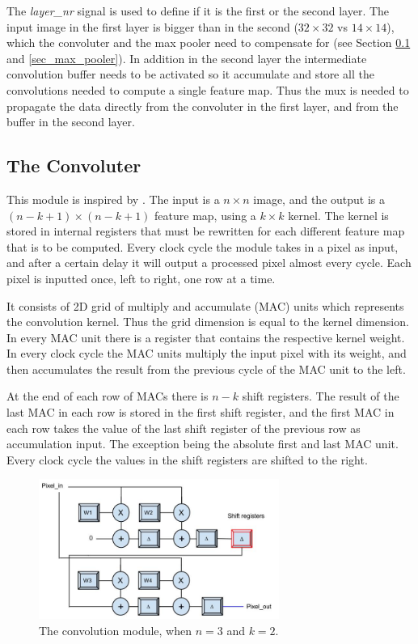 The \textit{layer\_nr} signal is used to define if it is the first or the second layer. The input image in the first layer is bigger than in the second ($ 32 \times 32 $ vs $ 14 \times 14 $), which the convoluter and the max pooler need to compensate for (see Section \ref{sec_convoluter} and \ref{sec_max_pooler}). In addition in the second layer the intermediate convolution buffer needs to be activated so it accumulate and store all the convolutions needed to compute a single feature map. Thus the mux is needed to propagate the data directly from the convoluter in the first layer, and from the buffer in the second layer. 


\subsection{The Convoluter} \label{sec_convoluter}

This module is inspired by \cite{Farabet2009}. The input is a $ n \times n $ image, and the output is a $ (n-k+1) \times (n-k+1) $ feature map, using a $ k \times k $ kernel. The kernel is stored in internal registers that must be rewritten for each different feature map that is to be computed. Every clock cycle the module takes in a pixel as input, and after a certain delay it will output a processed pixel almost every cycle. Each pixel is inputted once, left to right, one row at a time. 

It consists of 2D grid of multiply and accumulate (MAC) units which represents the convolution kernel. Thus the grid dimension is equal to the kernel dimension. In every MAC unit there is a register that contains the respective kernel weight. In every clock cycle the MAC units multiply the input pixel with its weight, and then accumulates the result from the previous cycle of the MAC unit to the left. 

At the end of each row of MACs there is $ n - k $ shift registers. The result of the last MAC in each row is stored in the first shift register, and the first MAC in each row takes the value of the last shift register of the previous row as accumulation input. The exception being the absolute first and last MAC unit. Every clock cycle the values in the shift registers are shifted to the right. 

\begin{figure}[h!]
  \centering
      \includegraphics[width=0.7\textwidth]{Figures/Method/Convolver}
  \caption{The convolution module, when $ n = 3 $ and $ k = 2 $.}
\end{figure}
	
